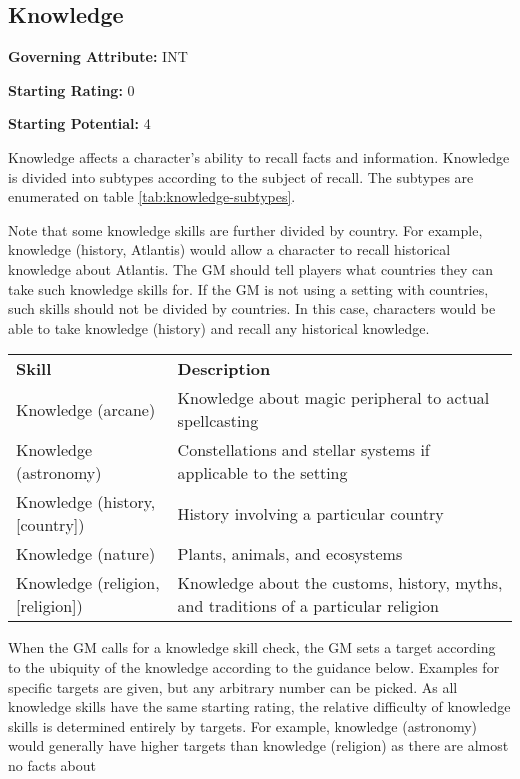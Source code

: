 \subsection{Knowledge}\label{skill:knowledge}

\noindent
\textbf{Governing Attribute:} INT

\noindent
\textbf{Starting Rating:} 0

\noindent
\textbf{Starting Potential:} 4


Knowledge affects a character's ability to recall facts and information.
Knowledge is divided into subtypes according to the subject of recall. The
subtypes are enumerated on table \ref{tab:knowledge-subtypes}.

Note that some knowledge skills are further divided by country. For example,
knowledge (history, Atlantis) would allow a character to recall historical
knowledge about Atlantis. The GM should tell players what countries they can
take such knowledge skills for. If the GM is not using a setting with
countries, such skills should not be divided by countries. In this case,
characters would be able to take knowledge (history) and recall any historical
knowledge.

\begin{center}
    \unclassedrowcolors
    \begin{tabularx}{0.5\textwidth}{X X}
        \textbf{Skill} & \textbf{Description} \\
        Knowledge (arcane) & Knowledge about magic peripheral to actual spellcasting \\
        Knowledge (astronomy) & Constellations and stellar systems if applicable to the setting \\
        Knowledge (history, [country]) & History involving a particular country \\
        Knowledge (nature) & Plants, animals, and ecosystems \\
        Knowledge (religion, [religion]) & Knowledge about the customs, history, myths, and traditions of a particular religion \\
    \end{tabularx}
    \label{tab:knowledge-subtypes}
\end{center}

When the GM calls for a knowledge skill check, the GM sets a target according
to the ubiquity of the knowledge according to the guidance below. Examples
for specific targets are given, but any arbitrary number can be picked. As
all knowledge skills have the same starting rating, the relative difficulty
of knowledge skills is determined entirely by targets. For example, knowledge
(astronomy) would generally have higher targets than knowledge (religion) as
there are almost no facts about

